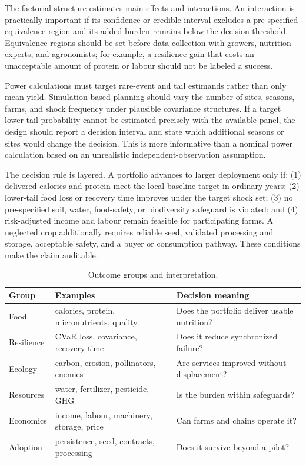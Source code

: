 \documentclass[conference]{IEEEtran}
\begin{document}
The factorial structure estimates main effects and interactions. An interaction is practically important if its confidence or credible interval excludes a pre-specified equivalence region and its added burden remains below the decision threshold. Equivalence regions should be set before data collection with growers, nutrition experts, and agronomists; for example, a resilience gain that costs an unacceptable amount of protein or labour should not be labeled a success.

Power calculations must target rare-event and tail estimands rather than only mean yield. Simulation-based planning should vary the number of sites, seasons, farms, and shock frequency under plausible covariance structures. If a target lower-tail probability cannot be estimated precisely with the available panel, the design should report a decision interval and state which additional seasons or sites would change the decision. This is more informative than a nominal power calculation based on an unrealistic independent-observation assumption.

The decision rule is layered. A portfolio advances to larger deployment only if: (1) delivered calories and protein meet the local baseline target in ordinary years; (2) lower-tail food loss or recovery time improves under the target shock set; (3) no pre-specified soil, water, food-safety, or biodiversity safeguard is violated; and (4) risk-adjusted income and labour remain feasible for participating farms. A neglected crop additionally requires reliable seed, validated processing and storage, acceptable safety, and a buyer or consumption pathway. These conditions make the claim auditable.

\begin{table}[t]
\centering
\caption{Outcome groups and interpretation.}
\label{tab:outcomes}
\scriptsize
\setlength{\tabcolsep}{2pt}
\begin{tabular}{>{\raggedright\arraybackslash}p{}>{\raggedright\arraybackslash}p{}>{\raggedright\arraybackslash}p{}}
\toprule
Group & Examples & Decision meaning\\
\midrule
Food & calories, protein, micronutrients, quality & Does the portfolio deliver usable nutrition?\\
Resilience & CVaR loss, covariance, recovery time & Does it reduce synchronized failure?\\
Ecology & carbon, erosion, pollinators, enemies & Are services improved without displacement?\\
Resources & water, fertilizer, pesticide, GHG & Is the burden within safeguards?\\
Economics & income, labour, machinery, storage, price & Can farms and chains operate it?\\
Adoption & persistence, seed, contracts, processing & Does it survive beyond a pilot?\\
\bottomrule
\end{tabular}
\end{table}
\end{document}
